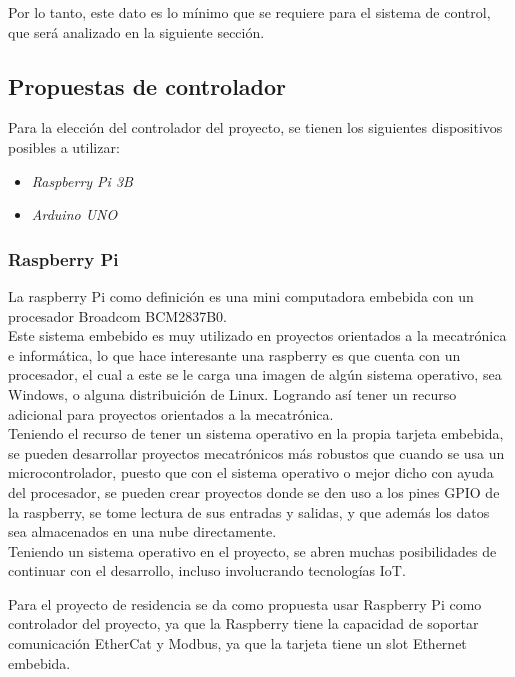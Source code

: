 \documentclass[12pt,titlepage]{article}
\begin{document}
Por lo tanto, este dato es lo mínimo que se requiere para el sistema de control, que será analizado en la siguiente sección. \\ 

\subsection{Propuestas de controlador}
Para la elección del controlador del proyecto, se tienen los siguientes dispositivos posibles a utilizar: \\ 

\begin{itemize}
\item \textit{Raspberry Pi 3B}
\item \textit{Arduino UNO}
\end{itemize}

\subsubsection{Raspberry Pi}
La raspberry Pi como definición es una mini computadora embebida con un procesador Broadcom BCM2837B0.\\

Este sistema embebido es muy utilizado en proyectos orientados a la mecatrónica e informática, lo que hace interesante una raspberry es que cuenta con un procesador, el cual a este se le carga una imagen de algún sistema operativo, sea Windows, o alguna distribuición de Linux. Logrando así tener un recurso adicional para proyectos orientados a la mecatrónica. \\ 

Teniendo el recurso de tener un sistema operativo en la propia tarjeta embebida, se pueden desarrollar proyectos mecatrónicos más robustos que cuando se usa un microcontrolador, puesto que con el sistema operativo o mejor dicho con ayuda del procesador, se pueden crear proyectos donde se den uso a los pines GPIO de la raspberry, se tome lectura de sus entradas y salidas, y que además los datos sea almacenados en una nube directamente. \\ 

Teniendo un sistema operativo en el proyecto, se abren muchas posibilidades de continuar con el desarrollo, incluso involucrando tecnologías IoT. \\ 

\newpage

Para el proyecto de residencia se da como propuesta usar Raspberry Pi como controlador del proyecto, ya que la Raspberry tiene la capacidad de soportar comunicación EtherCat y Modbus, ya que la tarjeta tiene un slot Ethernet embebida.\\ 
\end{document}
